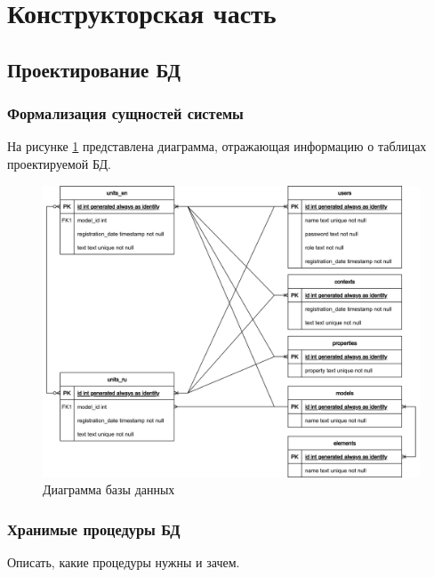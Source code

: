 \section{Конструкторская часть}


\subsection{Проектирование БД}

\subsubsection{Формализация сущностей системы}

На рисунке \ref{fig:db} представлена диаграмма, отражающая информацию о таблицах проектируемой БД.

\begin{figure}[h]
	\centering
	\includegraphics[width=\textwidth ]{img/db/db.drawio.png}
	\caption{Диаграмма базы данных}
	\label{fig:db}
\end{figure} 

\subsubsection{Хранимые процедуры БД}

Описать, какие процедуры нужны и зачем.

